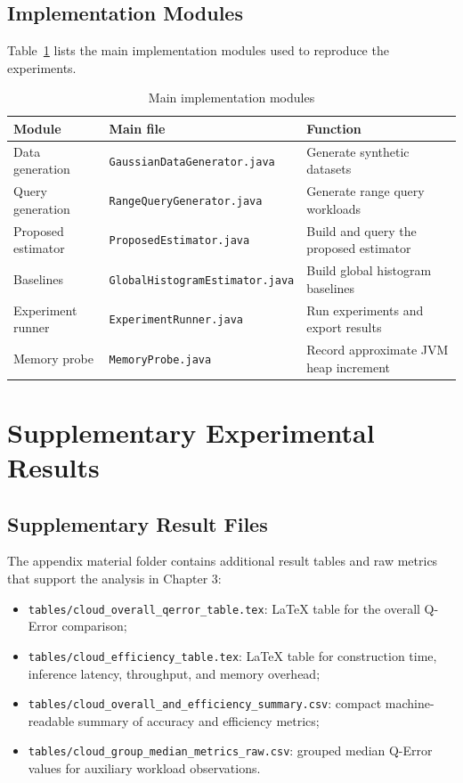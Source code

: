 \section{Implementation Modules}

Table~\ref{tab:app_project_modules} lists the main implementation modules used
to reproduce the experiments.

\begin{table}[htbp]
    \centering
    \caption{Main implementation modules}
    \label{tab:app_project_modules}
    \small
    \begin{tabular}{lll}
        \toprule
        Module & Main file & Function \\
        \midrule
        Data generation & \texttt{GaussianDataGenerator.java} & Generate synthetic datasets \\
        Query generation & \texttt{RangeQueryGenerator.java} & Generate range query workloads \\
        Proposed estimator & \texttt{ProposedEstimator.java} & Build and query the proposed estimator \\
        Baselines & \texttt{GlobalHistogramEstimator.java} & Build global histogram baselines \\
        Experiment runner & \texttt{ExperimentRunner.java} & Run experiments and export results \\
        Memory probe & \texttt{MemoryProbe.java} & Record approximate JVM heap increment \\
        \bottomrule
    \end{tabular}
\end{table}

\chapter{Supplementary Experimental Results}

\section{Supplementary Result Files}

The appendix material folder contains additional result tables and raw metrics
that support the analysis in Chapter 3:

\begin{itemize}
    \item \texttt{tables/cloud\_overall\_qerror\_table.tex}: LaTeX table for
    the overall Q-Error comparison;
    \item \texttt{tables/cloud\_efficiency\_table.tex}: LaTeX table for
    construction time, inference latency, throughput, and memory overhead;
    \item \texttt{tables/cloud\_overall\_and\_efficiency\_summary.csv}: compact
    machine-readable summary of accuracy and efficiency metrics;
    \item \texttt{tables/cloud\_group\_median\_metrics\_raw.csv}: grouped
    median Q-Error values for auxiliary workload observations.
\end{itemize}


